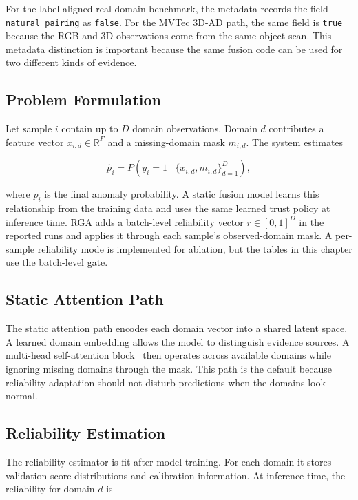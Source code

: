 \documentclass[11pt]{article}
\newcommand{\method}{RGA}
\begin{document}
For the label-aligned real-domain benchmark, the metadata records the field
\texttt{natural\_pairing} as \texttt{false}. For the MVTec 3D-AD path, the same
field is \texttt{true} because the RGB and 3D observations come from the same
object scan. This metadata distinction is important because the same fusion code
can be used for two different kinds of evidence.

\subsection{Problem Formulation}

Let sample $i$ contain up to $D$ domain observations. Domain $d$ contributes a
feature vector $x_{i,d} \in \mathbb{R}^{F}$ and a missing-domain mask
$m_{i,d}$. The system estimates

\begin{equation}
  \hat{p}_i = P(y_i=1 \mid \{x_{i,d},m_{i,d}\}_{d=1}^{D}),
\end{equation}

where $\hat{p}_i$ is the final anomaly probability. A static fusion model learns
this relationship from the training data and uses the same learned trust policy
at inference time. \method{} adds a batch-level reliability vector
$r \in [0,1]^D$ in the reported runs and applies it through each sample's
observed-domain mask. A per-sample reliability mode is implemented for
ablation, but the tables in this chapter use the batch-level gate.

\subsection{Static Attention Path}

The static attention path encodes each domain vector into a shared latent
space. A learned domain embedding allows the model to distinguish evidence
sources. A multi-head self-attention block~\cite{vaswani2017attention} then
operates across available domains while ignoring missing domains through the
mask. This path is the default because reliability
adaptation should not disturb predictions when the domains look normal.

\subsection{Reliability Estimation}

The reliability estimator is fit after model training. For each domain it stores
validation score distributions and calibration information. At inference time,
the reliability for domain $d$ is
\end{document}
